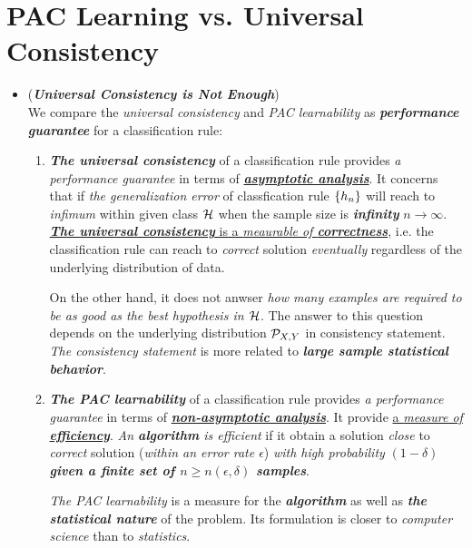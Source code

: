 \documentclass[11pt]{article}
\begin{document}
\section{PAC Learning vs. Universal Consistency}
\begin{itemize}
\item \begin{remark} (\emph{\textbf{Universal Consistency is Not Enough}}) \citep{shalev2014understanding}\\
We compare the \emph{universal consistency} and \emph{PAC learnability} as \emph{\textbf{performance guarantee}} for a classification rule:
\begin{enumerate}
\item \emph{\textbf{The universal consistency}} of a classification rule provides \emph{a performance guarantee} in terms of \underline{\emph{\textbf{asymptotic analysis}}}. It concerns that if \emph{the generalization error} of classfication rule $\left\{h_n\right\}$ will reach to \emph{infimum} within given class ${\mathcal H}$ when the sample size is \emph{\textbf{infinity}} $n \to \infty$.  \underline{\emph{\textbf{The universal consistency}} is a \emph{meaurable of \textbf{correctness}}}, i.e. the classification rule can reach to \emph{correct} solution \emph{eventually} regardless of the underlying distribution of data.

On the other hand, it does not anwser \emph{how many examples are required to be as good as the best hypothesis in ${\mathcal H}$}. The answer to this question depends on the underlying distribution ${\mathcal P}_{X,Y}$ in consistency statement.  %
\emph{The consistency statement} is more related to \emph{\textbf{large sample statistical behavior}}.

\item \emph{\textbf{The PAC learnability}} of a classification rule provides \emph{a performance guarantee} in terms of \underline{\emph{\textbf{non-asymptotic analysis}}}. It provide \underline{a \emph{measure of \textbf{efficiency}}}. \emph{An \textbf{algorithm} is efficient} if it obtain a solution \emph{close} to \emph{correct} solution (\emph{within an error rate $\epsilon$}) \emph{with high probability} $(1 - \delta)$ \emph{\textbf{given a finite set  of $n \ge n(\epsilon, \delta)$ samples}}. 

\emph{The PAC learnability} is a measure for the \emph{\textbf{algorithm}} as well as \emph{\textbf{the statistical nature}} of the problem. Its formulation is closer to \emph{computer science} than to \emph{statistics}. 


\end{enumerate}
\end{remark}
\end{itemize}
\end{document}
